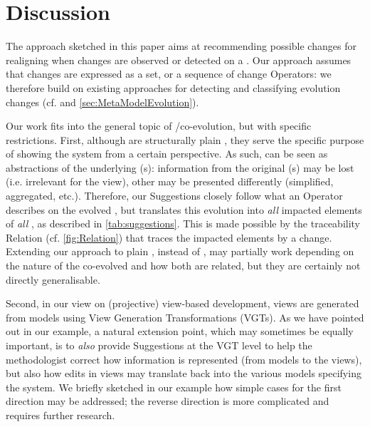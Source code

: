 \section{Discussion}
\label{sec:Discussion}

The approach sketched in this paper aims at recommending possible changes 
for realigning \viewtypes when changes are observed or detected on a 
\metamodel. Our approach assumes that \metamodel changes are expressed
as a set, or a sequence of change \textsf{Operator}s: we therefore build
on existing approaches for detecting and classifying evolution changes
(cf. \cite{herrmannsdoerfer_extensive_2011,khelladi_detecting_2015} and  \cref{sec:MetaModelEvolution}).

Our work fits into the general topic of \metamodel/\metamodel co-evolution,
but with specific restrictions. First, although \viewtypes are structurally 
plain \metamodels, they serve the specific purpose of showing the system from a certain perspective.
As such, \viewtypes can
be seen as abstractions of the underlying \metamodel{}(s): information from
the original \metamodel{}(s) may be lost (i.e. irrelevant for the view), other
may be presented differently (simplified, aggregated, etc.). Therefore, our
\textsf{Suggestion}s closely follow what an \textsf{Operator} describes on
the evolved \metamodel, but translates this evolution into \emph{all} impacted
elements of \emph{all} \viewtypes, as described in \cref{tab:suggestions}.
This is made possible by the traceability \textsf{Relation} 
(cf. \cref{fig:Relation}) that traces the impacted \viewtype elements by a change.
Extending our approach to plain \metamodels, instead of \viewtypes, may partially
work depending on the nature of the co-evolved \metamodels and how
both \metamodels are related, but they are certainly not directly generalisable.

Second, in our view on (projective) view-based development, views are generated
from models using View Generation Transformations (VGTs). As we have pointed out in our
example, a natural extension point, which may sometimes be equally important,
is to \emph{also} provide \textsf{Suggestion}s at the VGT level to help the
methodologist correct how information is represented (from models to the views),
but also how edits in views may translate back into the various models specifying
the system. We briefly sketched in our example how simple cases for the first 
direction may be addressed; the reverse direction is more complicated and requires
further research.

